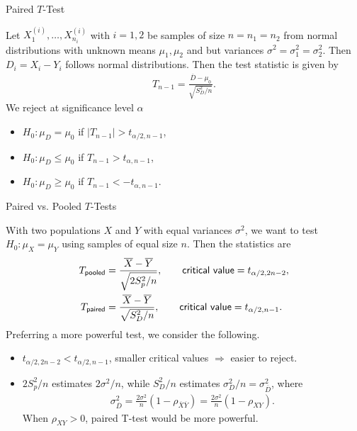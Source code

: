 \begin{frame}{Paired $T$-Test}

\justifying
{} Let $X_1^{(i)}, \ldots, X_{n_i}^{(i)}$ with $i = 1, 2$ be samples of size $n = n_1 = n_2$ from normal distributions with unknown means $\mu_1, \mu_2$ and  but  variances $\sigma^2 = \sigma_1^2 = \sigma_2^2$. Then $D_i = X_i - Y_i$ follows normal distributions. Then the test statistic is given by
\begin{align*}
T_{n-1} = \frac{\overline{D} - \mu_0}{\sqrt{S^2_D/n}}.
\end{align*}
We reject at significance level $\alpha$
\begin{itemize}
	\item $H_0: \mu_D = \mu_0$ if $|T_{n-1}| > t_{\alpha/2,n-1}$,
	\item $H_0: \mu_D \leq \mu_0$ if $T_{n-1} > t_{\alpha,n-1}$,
	\item $H_0: \mu_D \geq \mu_0$ if $T_{n-1} < -t_{\alpha,n-1}$.
\end{itemize}


\end{frame}

\begin{frame}{Paired vs. Pooled $T$-Tests}

\justifying
With two populations $X$ and $Y$ with equal variances $\sigma^2$, we want to test $H_0: \mu_X = \mu_Y$ using samples of equal size $n$. Then the statistics are
\footnotesize
\begin{align*}
T_{\mathsf{pooled}} & = \frac{\overline{X} - \overline{Y}}{\sqrt{2S_p^2/n}}, \qquad \mathsf{critical\ value} = t_{\alpha/2,2n-2}, \\
T_{\mathsf{paired}} & = \frac{\overline{X}-\overline{Y}}{\sqrt{S_D^2/n}}, \qquad \mathsf{critical\ value} = t_{\alpha/2,n-1}.
\end{align*}
\normalsize
Preferring a more powerful test, we consider the following.
\begin{itemize}
	\justifying
	\item $t_{\alpha/2,2n-2} < t_{\alpha/2,n-1}$, smaller critical values $\Rightarrow$ easier to reject.
	\item $2S_p^2/n$ estimates $2\sigma^2/n$, while $S_D^2/n$ estimates $\sigma_D^2/n = \sigma_{\overline{D}}^2$, where
	\footnotesize
	\begin{align*}
	\sigma_{\overline{D}}^2 = \frac{2\sigma^2}{n}(1-\rho_{\overline{X}\overline{Y}}) = \frac{2\sigma^2}{n}(1-\rho_{XY}).
	\end{align*}
	\normalsize
	When $\rho_{XY} > 0$, paired T-test would be more powerful.
\end{itemize}

\end{frame}


